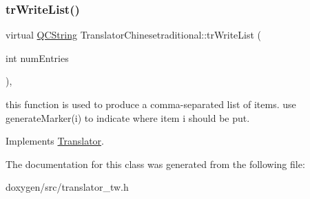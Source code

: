 \subsubsection{\texorpdfstring{trWriteList()}{trWriteList()}}
{\footnotesize\ttfamily virtual \mbox{\hyperlink{class_q_c_string}{Q\+C\+String}} Translator\+Chinesetraditional\+::tr\+Write\+List (\begin{DoxyParamCaption}\item[{int}]{num\+Entries }\end{DoxyParamCaption})\hspace{0.3cm}{\ttfamily [inline]}, {\ttfamily [virtual]}}

this function is used to produce a comma-\/separated list of items. use generate\+Marker(i) to indicate where item i should be put. 

Implements \mbox{\hyperlink{class_translator}{Translator}}.



The documentation for this class was generated from the following file\+:\begin{DoxyCompactItemize}
\item 
doxygen/src/translator\+\_\+tw.\+h\end{DoxyCompactItemize}
